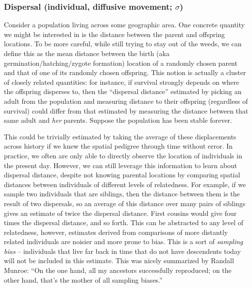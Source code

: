 \documentclass{ar-1col}
\begin{document}
\subsubsection{Dispersal (individual, diffusive movement; $\sigma$)}

Consider a population living across some geographic area.
One concrete quantity we might be interested in is
the distance between the parent and offspring locations.
To be more careful,
while still trying to stay out of the weeds,
we can define this as the mean distance between the
birth (aka germination/hatching/zygote formation)
location of a randomly chosen parent
and that of one of its randomly chosen offspring.
This notion is actually a cluster of closely related quantities:
for instance, if survival strongly depends on where the offspring disperses to,
then the ``dispersal distance'' estimated by picking an adult from the population
and measuring distance to their offspring (regardless of survival)
could differ from that estimated by measuring the distance between that same adult
and \emph{her} parents.
Suppose the population has been stable forever.


This could be trivially estimated by taking
the average of these displacements across history
if we knew the spatial pedigree through time without error.
In practice, we often are only able to directly observe
the location of individuals in the present day.
However, we can still leverage this information to learn about dispersal distance,
despite not knowing parental locations by
comparing spatial distances between individuals of different levels of relatedness.
For example, if we sample two individuals that are siblings,
then the distance between them is the result of two dispersals,
so an average of this distance over many pairs of siblings gives an estimate of twice the dispersal distance.
First cousins would give four times the dispersal distance, and so forth.
This can be abstracted to any level of relatedness,
however, estimates derived from comparisons of more distantly related individuals
are noisier and more prone to bias.
This is a sort of \emph{sampling bias} --
individuals that live far back in time that do not have descendents today
will not be included in this estimate.
This was nicely summarized by Randall Munroe: ``On the one hand, all my ancestors successfully reproduced; on the other hand, that's the mother of all sampling biases.''
\end{document}
